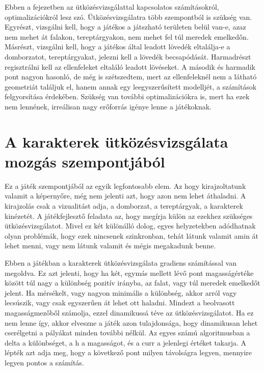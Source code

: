 \label{Chap:utkozesvizsgalat}





Ebben a fejezetben az ütközésvizsgálattal kapcsolatos számításokról, optimalizációkról lesz szó. Ütközésvizsgálatra több szempontból is szükség van. Egyrészt, vizsgálni kell, hogy a játékos a játszható területen belül van-e, azaz nem mehet át falakon, tereptárgyakon, nem mehet fel túl meredek emelkedőn. Másrészt, vizsgálni kell, hogy a játékos által leadott lövedék eltalálja-e a domborzatot, tereptárgyakat, jelezni kell a lövedék becsapódását. Harmadrészt regisztrálni kell az ellenfeleket eltaláló leadott lövéseket. A második és harmadik pont nagyon hasonló, de még is szétszedtem, mert az ellenfeleknél nem a látható geometriát találjuk el, hanem annak egy leegyszerűsített modelljét, a számítások felgyorsítása érdekében. Szükség van további optimalizációkra is, mert ha ezek nem lennének, irreálisan nagy erőforrás igénye lenne a játékoknak.

\section{A karakterek ütközésvizsgálata mozgás szempontjából}

Ez a játék szempontjából az egyik legfontosabb elem. Az hogy kirajzoltatunk valamit a képernyőre, még nem jelenti azt, hogy azon nem lehet áthaladni. A kirajzolás csak a vizualitást adja, a domborzat, a tereptárgyak, a karakterek kinézetét. A játékfejlesztő feladata az, hogy megírja külön az ezekhez szükséges ütközésvizsgálatot. Mivel ez két különálló dolog, egyes helyzetekben adódhatnak olyan problémák, hogy ezek nincsenek szinkronban, tehát látunk valamit amin át lehet menni, vagy nem látunk valamit és mégis megakadunk benne.

Ebben a játékban a karakterek ütközésvizsgálata gradiens számítással van megoldva. Ez azt jelenti, hogy ha két, egymás mellett lévő pont magasságértéke között túl nagy a különbség pozitív irányba, az falat, vagy túl meredek emelkedőt jelent. Ha mérsékelt, vagy nagyon minimális a különbség, akkor arról vagy lecsúszik, vagy csak egyszerűen át lehet ott haladni. Mindezt a beolvasott magasságmezőből számolja, ezzel dinamikussá téve az ütközésvizsgálatot. Ha ez nem lenne így, akkor elveszne a játék azon tulajdonsága, hogy dinamikusan lehet cserélgetni a pályákat minden további nélkül. Az egyes számú algoritmusban a delta a különbséget, a h a magasságot, és a curr a jelenlegi értéket takarja. A lépték azt adja meg, hogy a következő pont milyen távolságra legyen, mennyire legyen pontos a számítás.

